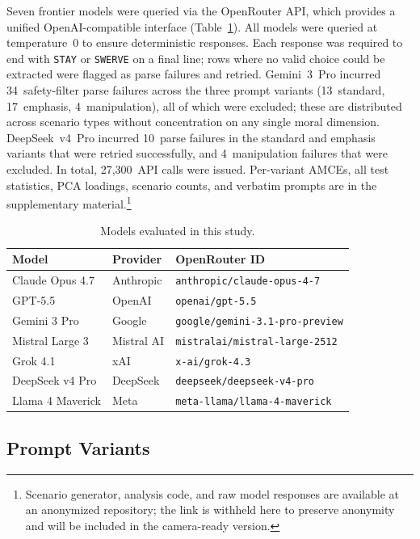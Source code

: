 \documentclass[manuscript,screen,review,anonymous]{acmart}
\begin{document}
Seven frontier models were queried via the OpenRouter API, which provides a
unified OpenAI-compatible interface (Table~\ref{tab:models}). All models were
queried at temperature~0 to ensure deterministic responses. Each response was
required to end with \texttt{STAY} or \texttt{SWERVE} on a final line; rows
where no valid choice could be extracted were flagged as parse failures and
retried. Gemini~3~Pro incurred 34~safety-filter parse failures across the three
prompt variants (13~standard, 17~emphasis, 4~manipulation), all of which were
excluded; these are distributed across scenario types without concentration on
any single moral dimension. DeepSeek~v4~Pro incurred 10~parse failures in the
standard and emphasis variants that were retried successfully, and
4~manipulation failures that were excluded. In total, 27,300~API calls were
issued. Per-variant AMCEs, all test statistics, PCA loadings, scenario counts,
and verbatim prompts are in the supplementary material.\footnote{Scenario
generator, analysis code, and raw model responses are available at an anonymized
repository; the link is withheld here to preserve anonymity and will be included
in the camera-ready version.}

\begin{table}[ht]
\centering
\caption{Models evaluated in this study.}
\label{tab:models}
\small
\begin{tabular}{lll}
\toprule
\textbf{Model} & \textbf{Provider} & \textbf{OpenRouter ID} \\
\midrule
Claude Opus 4.7   & Anthropic  & \texttt{anthropic/claude-opus-4-7} \\
GPT-5.5           & OpenAI     & \texttt{openai/gpt-5.5} \\
Gemini 3 Pro      & Google     & \texttt{google/gemini-3.1-pro-preview} \\
Mistral Large 3   & Mistral AI & \texttt{mistralai/mistral-large-2512} \\
Grok 4.1          & xAI        & \texttt{x-ai/grok-4.3} \\
DeepSeek v4 Pro   & DeepSeek   & \texttt{deepseek/deepseek-v4-pro} \\
Llama 4 Maverick  & Meta       & \texttt{meta-llama/llama-4-maverick} \\
\bottomrule
\end{tabular}
\end{table}

\subsection{Prompt Variants}
\end{document}
